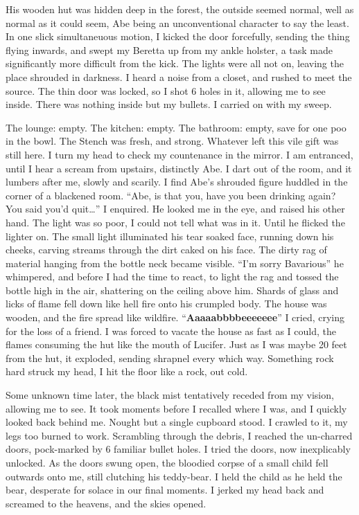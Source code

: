 His wooden hut was hidden deep in the forest, the outside seemed
normal, well as normal as it could seem, Abe being an
unconventional character to say the least. In one slick
simultaneuous motion, I kicked the door forcefully, sending the
thing flying inwards, and swept my Beretta up from my ankle
holster, a task made significantly more difficult from the kick.
The lights were all not on, leaving the place shrouded in darkness.
I heard a noise from a closet, and rushed to meet the source. The
thin door was locked, so I shot 6 holes in it, allowing me to see
inside. There was nothing inside but my bullets. I carried on with
my sweep.



The lounge: empty. The kitchen: empty. The bathroom: empty, save
for one poo in the bowl. The Stench was fresh, and strong. Whatever
left this vile gift was still here. I turn my head to check my
countenance in the mirror. I am entranced, until I hear a scream
from upstairs, distinctly Abe. I dart out of the room, and it
lumbers after me, slowly and scarily. I find Abe's shrouded
figure huddled in the corner of a blackened room. ``Abe, is
that you, have you been drinking again? You said you'd
quit{\ldots}'' I enquired. He looked me in the eye, and raised his
other hand. The light was so poor, I could not tell what was in it.
Until he flicked the lighter on. The small light illuminated his
tear soaked face, running down his cheeks, carving streams through
the dirt caked on his face. The dirty rag of material hanging from
the bottle neck became visible. ``I'm sorry
Bavarious'' he whimpered, and before I had the time to react,
to light the rag and tossed the bottle high in the air, shattering
on the ceiling above him. Shards of glass and licks of flame fell
down like hell fire onto his crumpled body. The house was wooden,
and the fire spread like wildfire. ``{\bf Aaaaabbbbeeeeeee}'' I
cried, crying for the loss of a friend. I was forced to vacate the
house as fast as I could, the flames consuming the hut like the
mouth of Lucifer. Just as I was maybe 20 feet from the hut, it
exploded, sending shrapnel every which way. Something rock hard
struck my head, I hit the floor like a rock, out cold.



Some unknown time later, the black mist tentatively receded from my
vision, allowing me to see. It took moments before I recalled where
I was, and I quickly looked back behind me. Nought but a single
cupboard stood. I crawled to it, my legs too burned to work.
Scrambling through the debris, I reached the un-charred doors,
pock-marked by 6 familiar bullet holes. I tried the doors, now
inexplicably unlocked. As the doors swung open, the bloodied corpse
of a small child fell outwards onto me, still clutching his
teddy-bear. I held the child as he held the bear, desperate for
solace in our final moments. I jerked my head back and screamed to
the heavens, and the skies opened. 
 



